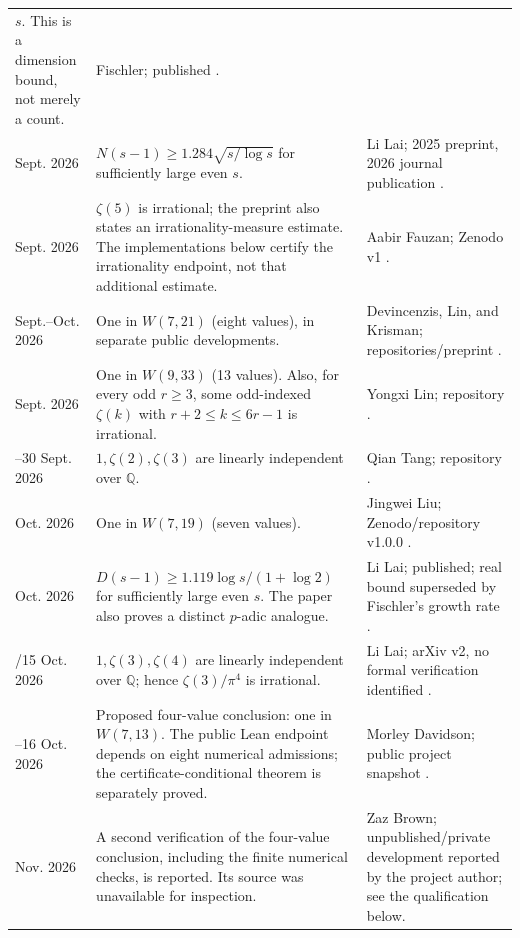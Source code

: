 \documentclass[11pt,letterpaper]{article}
\theoremstyle{definition}
\newcommand{\Q}{\mathbb Q}
\begin{document}
\begin{longtable}{@{}>{\raggedright\arraybackslash}p{}>{\raggedright\arraybackslash}p{}>{\raggedright\arraybackslash}p{}@{}}
$s$.  This is a dimension bound, not merely a count. & Fischler;
published \cite{fischler2026}.\\
16 Sept. 2026 & $N(s-1)\geq1.284\sqrt{s/\log s}$ for sufficiently large
even $s$. & Li Lai; 2025 preprint, 2026 journal publication
\cite{lai2026count}.\\
17 Sept. 2026 & $\zeta(5)$ is irrational; the preprint also states an
irrationality-measure estimate.  The implementations below certify the
irrationality endpoint, not that additional estimate. & Aabir Fauzan;
Zenodo v1 \cite{fauzan2026}.\\
Sept.--Oct. 2026 & One in $W(7,21)$ (eight values), in separate public
developments. & Devincenzis, Lin, and Krisman; repositories/preprint
\cite{devincenzis2026,lin2026,krisman2026}.\\
29 Sept. 2026 & One in $W(9,33)$ (13 values).  Also, for every odd
$r\geq3$, some odd-indexed $\zeta(k)$ with $r+2\leq k\leq6r-1$ is
irrational. & Yongxi Lin; repository \cite{lin2026}.\\
29--30 Sept. 2026 & $1,\zeta(2),\zeta(3)$ are linearly independent over
$\Q$. & Qian Tang; repository \cite{tang2026}.\\
6 Oct. 2026 & One in $W(7,19)$ (seven values). & Jingwei Liu;
Zenodo/repository v1.0.0 \cite{jingweiliu2026}.\\
8 Oct. 2026 & $D(s-1)\geq1.119\log s/(1+\log2)$ for sufficiently large
even $s$.  The paper also proves a distinct $p$-adic analogue. & Li Lai;
published; real bound superseded by Fischler's growth rate
\cite{lai2026small}.\\
5/15 Oct. 2026 & $1,\zeta(3),\zeta(4)$ are linearly independent over
$\Q$; hence $\zeta(3)/\pi^4$ is irrational. & Li Lai;
arXiv v2, no formal verification identified \cite{lai2026linear}.\\
15--16 Oct. 2026 & Proposed four-value conclusion: one in $W(7,13)$.
The public Lean endpoint depends on eight numerical admissions; the
certificate-conditional theorem is separately proved. & Morley Davidson;
public project snapshot \cite{davidson2026}.\\
Nov. 2026 & A second verification of the four-value conclusion, including
the finite numerical checks, is reported.  Its source was unavailable for
inspection. & Zaz Brown; unpublished/private development reported by the
project author; see the qualification below.\\
\end{longtable}
\endgroup
\end{document}
